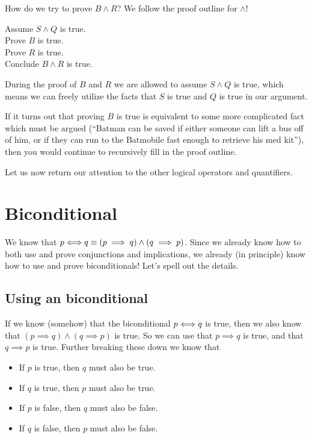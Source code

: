  

How do we try to prove $B \wedge R$?  We follow the proof outline for $\wedge$!

\begin{fitch*}
	\textrm{Assume $S \wedge Q$ is true.}\\
	\fa \textrm{Prove $B$ is true.}\\
	\fa \textrm{Prove $R$  is true.}\\
	\fa \textrm{Conclude $B \wedge R$ is true.}
\end{fitch*}

During the proof of $B$ and $R$ we are allowed to assume $S \wedge Q$ is true, which means we can freely utilize the facts that $S$ is true and $Q$ is true in our argument.

If it turns out that proving $B$ is true is equivalent to some more complicated fact which must be argued (``Batman can be saved if either someone can lift a bus off of him, or if they can run to the Batmobile fast enough to retrieve his med kit''), then you would continue to recursively fill in the proof outline.

Let us now return our attention to the other logical operators and quantifiers.

\newpage

\section{Biconditional}

We know that $p \Longleftrightarrow q \equiv (p \implies q) \wedge (q \implies p)$.  Since we already know how to both use and prove conjunctions and implications, we already (in principle) know how to use and prove biconditionals!  Let's spell out the details.

\subsection{Using an biconditional} 

If we know (somehow) that the biconditional $p \Longleftrightarrow q$ is true, then we also know that $(p \implies q) \wedge (q \implies p)$ is true.  So we can use that $p \implies q$ is true, and that $q \implies p$ is true.   Further breaking these down we know that

\begin{itemize}
		\item If $p$ is true, then $q$ must also be true.
		\item If $q$ is true, then $p$ must also be true.
		\item If $p$ is false, then $q$ must also be false.
		\item If $q$ is false, then $p$ must also be false. 
	\end{itemize}

